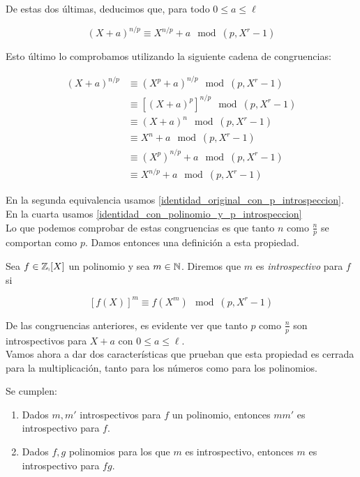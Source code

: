 De estas dos últimas, deducimos que, para todo $0 \leq a \leq \ell$

\begin{equation}\label{identidad_np_introspeccion}
(X + a)^{n/p} \equiv X^{n/p} + a \mod(p, X^r - 1)
\end{equation}

Esto último lo comprobamos utilizando la siguiente cadena de congruencias:

\begin{align}
(X + a)^{n/p} &\equiv (X^p + a)^{n/p} \mod(p, X^r - 1)\\
&\equiv \left[(X + a)^p\right]^{n/p} \mod(p, X^r - 1)\\
&\equiv (X + a)^n \mod(p, X^r - 1)\\
&\equiv X^n + a \mod(p, X^r - 1)\\
&\equiv (X^p)^{n/p} + a \mod(p, X^r - 1)\\
&\equiv X^{n/p} + a \mod(p, X^r - 1)
\end{align}

En la segunda equivalencia usamos \eqref{identidad_original_con_p_introspeccion}. En la cuarta usamos \eqref{identidad_con_polinomio_y_p_introspeccion}\\

Lo que podemos comprobar de estas congruencias es que tanto $n$ como $\frac{n}{p}$ se comportan como $p$. Damos entonces una definición a esta propiedad.

\begin{definicion}
	Sea $f \in \mathbb{\mathbb{Z}_p}[X]$ un polinomio y sea $m \in \mathbb{N}$. Diremos que $m$ es \textit{introspectivo} para $f$ si
	
	\[ \left[f(X)\right]^m \equiv f(X^m) \mod(p, X^r - 1) \]
\end{definicion}

De las congruencias anteriores, es evidente ver que tanto $p$ como $\frac{n}{p}$ son introspectivos para $X + a$ con $0 \leq a \leq \ell$.\\

Vamos ahora a dar dos características que prueban que esta propiedad es cerrada para la multiplicación, tanto para los números como para los polinomios.

\begin{lema}
	Se cumplen:
	
	\begin{enumerate}
		\item Dados $m, m'$ introspectivos para $f$ un polinomio, entonces $mm'$ es introspectivo para $f$.
		
		\item Dados $f, g$ polinomios para los que $m$ es introspectivo, entonces $m$ es introspectivo para $fg$. 
	\end{enumerate}
\end{lema}

